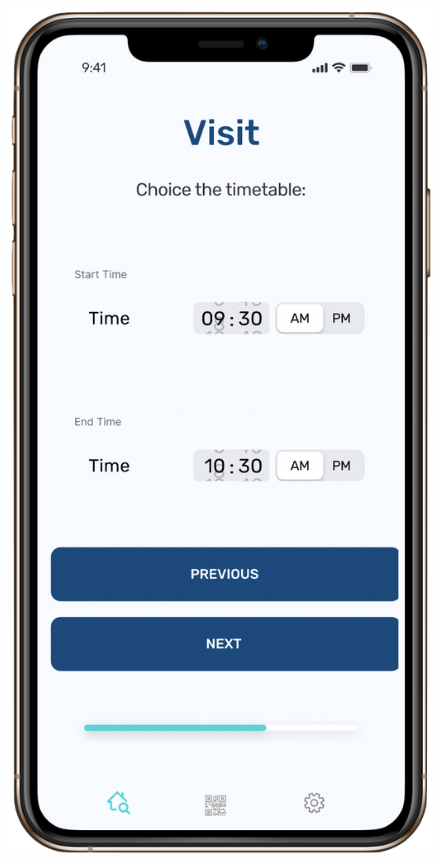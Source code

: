 \begin{figure}[H]
\begin{center}
{            \label{fig:third}
            \includegraphics[scale=0.30]{images/mockup/visit2.png}
        }%
\end{center}
\end{figure}
